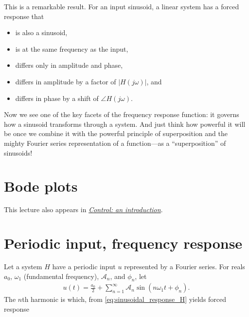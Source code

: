 \documentclass[dynamic_systems.tex]{subfiles}
\begin{document}
This is a remarkable result.
For an input sinusoid, a linear system has a forced response that
\begin{itemize}
	\item is also a sinusoid,
	\item is at the same frequency as the input,
	\item differs only in amplitude and phase,
	\item differs in amplitude by a factor of $|H(j\omega)|$, and
	\item differs in phase by a shift of $\angle H(j\omega)$.
\end{itemize}

Now we see one of the key facets of the frequency response function: it governs how a sinusoid transforms through a system.
And just think how powerful it will be once we combine it with the powerful principle of superposition and the mighty Fourier series representation of a function---as a ``superposition'' of sinusoids! 
\tags{}

\section{Bode plots} 
\tags{}
\label{sec:bodeplots}

This lecture also appears in \href{http://ricopic.one/control/}{\emph{Control: an introduction}}.



\clearpage

\section[Periodic frequency response]{Periodic input, frequency response}
\tags{}

Let a system $H$ have a periodic input $u$ represented by a Fourier series.
For reals $a_0$, $\omega_1$ (fundamental frequency), $\mathcal{A}_n$, and $\phi_n$, let
\tags{}
\begin{align}
	u(t) = \frac{a_0}{2} + \sum_{n=1}^\infty \mathcal{A}_n \sin(n\omega_1 t + \phi_n).
\end{align}
The $n$th harmonic is
which, from \autoref{eq:sinusoidal_response_H} yields forced response
\end{document}
